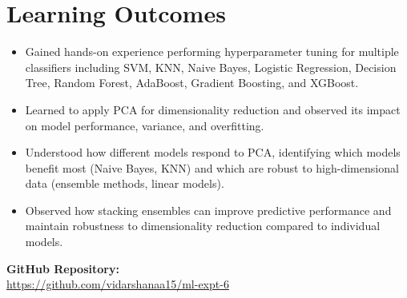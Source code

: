 \documentclass[11pt]{article}
\begin{document}
\vspace{1cm}
\section{Learning Outcomes}
\begin{itemize}
    \item Gained hands-on experience performing hyperparameter tuning for multiple classifiers including SVM, KNN, Naive Bayes, Logistic Regression, Decision Tree, Random Forest, AdaBoost, Gradient Boosting, and XGBoost.
    \item Learned to apply PCA for dimensionality reduction and observed its impact on model performance, variance, and overfitting.
    \item Understood how different models respond to PCA, identifying which models benefit most (Naive Bayes, KNN) and which are robust to high-dimensional data (ensemble methods, linear models).
    \item Observed how stacking ensembles can improve predictive performance and maintain robustness to dimensionality reduction compared to individual models.
\end{itemize}


\vspace{1cm}
\noindent
\textbf{GitHub Repository:} \\
\href{https://github.com/vidarshanaa15/ml-expt-6}{https://github.com/vidarshanaa15/ml-expt-6}

\end{document}

